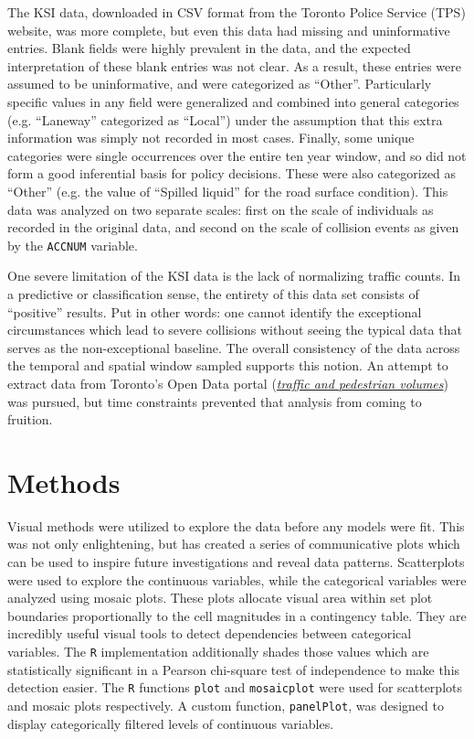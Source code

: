 \documentclass{article}
\begin{document}
The KSI data, downloaded in CSV format from the Toronto Police Service (TPS) website, was more complete, but even this data had
missing and uninformative entries. Blank fields were highly prevalent in the data, and the expected interpretation of these blank entries
was not clear. As a result, these entries were assumed to be uninformative, and were categorized as ``Other''. Particularly specific
values in any field were generalized and combined into general categories (e.g. ``Laneway'' categorized as ``Local'') under the
assumption that this extra information was simply not recorded in most cases. Finally, some unique categories were single
occurrences over the entire ten year window, and so did not form a good inferential basis for policy decisions. These were also
categorized as ``Other'' (e.g. the value of ``Spilled liquid'' for the road surface condition). This data was analyzed on two
separate scales: first on the scale of individuals as recorded in the original data, and second on the scale of collision events as given by the \texttt{ACCNUM} variable.

One severe limitation of the KSI data is the lack of normalizing traffic counts. In a predictive or classification sense, the
entirety of this data set consists of ``positive'' results. Put in other words: one cannot identify the exceptional circumstances
which lead to severe collisions without seeing the typical data that serves as the non-exceptional baseline. The overall
consistency of the data across the temporal and spatial window sampled supports this notion. An attempt to extract data from Toronto's
Open Data portal
(\href{https://www.toronto.ca/city-government/data-research-maps/open-data/open-data-catalogue/transportation/#7c8e7c62-7630-8b0f-43ed-a2dfe24aadc9}{\textit{traffic
    and pedestrian volumes}}) was pursued, but time constraints prevented that analysis from coming to fruition.

\section{Methods} \label{sec:methods}

Visual methods were utilized to explore the data before any models were fit. This was not only enlightening, but has created a series of communicative plots which can be used to inspire future investigations and reveal data patterns. Scatterplots were used to explore the continuous variables, while the categorical
variables were analyzed using mosaic plots. These plots allocate visual area within set plot boundaries proportionally to the cell
magnitudes in a contingency table. They are incredibly useful visual tools to detect dependencies between categorical
variables. The \texttt{R} implementation additionally shades those values which are statistically significant in a Pearson chi-square test
of independence to make this detection easier. The \texttt{R} functions \texttt{plot} and \texttt{mosaicplot} were used for scatterplots and mosaic plots
respectively. A custom function, \texttt{panelPlot}, was designed to display categorically filtered levels of continuous
variables.
\end{document}
